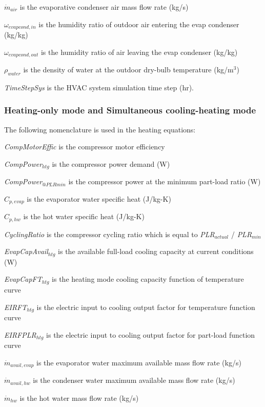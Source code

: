 \({\dot{m}_{air}}\) is the evaporative condenser air mass flow rate (kg/s)

\({\omega_{evapcond,in}}\) is the humidity ratio of outdoor air entering the evap condenser (kg/kg)

\({\omega_{evapcond,out}}\) is the humidity ratio of air leaving the evap condenser (kg/kg)

\({\rho_{water}}\) is the density of water at the outdoor dry-bulb temperature (kg/m\(^{3}\))

\emph{TimeStepSys} is the HVAC system simulation time step (hr).


\subsubsection{Heating-only mode and Simultaneous cooling-heating mode}\label{heating-only-mode-and-simultaneous-cooling-heating-mode}

The following nomenclature is used in the heating equations:

\emph{CompMotorEffic} is the compressor motor efficiency

\emph{CompPower\(_{htg}\)} is the compressor power demand (W)

\emph{CompPower\(_{@PLRmin}\)} is the compressor power at the minimum part-load ratio (W)

\({C_{p,evap}}\) is the evaporator water specific heat (J/kg-K)

\({C_{p,hw}}\) is the hot water specific heat (J/kg-K)

\emph{CyclingRatio} is the compressor cycling ratio which is equal to \emph{PLR\(_{actual}\)} / \emph{PLR\(_{min}\)}

\emph{EvapCapAvail\(_{htg}\)} is the available full-load cooling capacity at current conditions (W)

\emph{EvapCapFT\(_{htg}\)} is the heating mode cooling capacity function of temperature curve

\emph{EIRFT\(_{htg}\)} is the electric input to cooling output factor for temperature function curve

\emph{EIRFPLR\(_{htg}\)} is the electric input to cooling output factor for part-load function curve

\({\dot m_{avail,evap}}\) is the evaporator water maximum available mass flow rate (kg/s)

\({\dot m_{avail,hw}}\) is the condenser water maximum available mass flow rate (kg/s)

\({\dot m_{hw}}\) is the hot water mass flow rate (kg/s)

